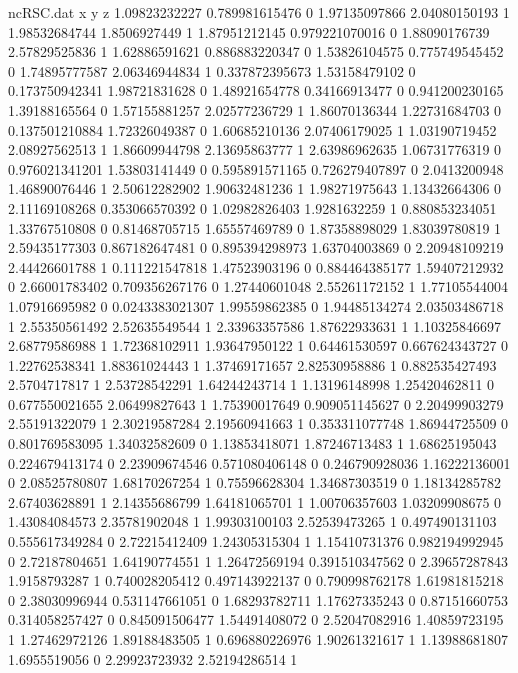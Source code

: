 \begin{filecontents}{ncRSC.dat}
x y z
1.09823232227 0.789981615476 0
1.97135097866 2.04080150193 1
1.98532684744 1.8506927449 1
1.87951212145 0.979221070016 0
1.88090176739 2.57829525836 1
1.62886591621 0.886883220347 0
1.53826104575 0.775749545452 0
1.74895777587 2.06346944834 1
0.337872395673 1.53158479102 0
0.173750942341 1.98721831628 0
1.48921654778 0.34166913477 0
0.941200230165 1.39188165564 0
1.57155881257 2.02577236729 1
1.86070136344 1.22731684703 0
0.137501210884 1.72326049387 0
1.60685210136 2.07406179025 1
1.03190719452 2.08927562513 1
1.86609944798 2.13695863777 1
2.63986962635 1.06731776319 0
0.976021341201 1.53803141449 0
0.595891571165 0.726279407897 0
2.0413200948 1.46890076446 1
2.50612282902 1.90632481236 1
1.98271975643 1.13432664306 0
2.11169108268 0.353066570392 0
1.02982826403 1.9281632259 1
0.880853234051 1.33767510808 0
0.81468705715 1.65557469789 0
1.87358898029 1.83039780819 1
2.59435177303 0.867182647481 0
0.895394298973 1.63704003869 0
2.20948109219 2.44426601788 1
0.111221547818 1.47523903196 0
0.884464385177 1.59407212932 0
2.66001783402 0.709356267176 0
1.27440601048 2.55261172152 1
1.77105544004 1.07916695982 0
0.0243383021307 1.99559862385 0
1.94485134274 2.03503486718 1
2.55350561492 2.52635549544 1
2.33963357586 1.87622933631 1
1.10325846697 2.68779586988 1
1.72368102911 1.93647950122 1
0.64461530597 0.667624343727 0
1.22762538341 1.88361024443 1
1.37469171657 2.82530958886 1
0.882535427493 2.5704717817 1
2.53728542291 1.64244243714 1
1.13196148998 1.25420462811 0
0.677550021655 2.06499827643 1
1.75390017649 0.909051145627 0
2.20499903279 2.55191322079 1
2.30219587284 2.19560941663 1
0.353311077748 1.86944725509 0
0.801769583095 1.34032582609 0
1.13853418071 1.87246713483 1
1.68625195043 0.224679413174 0
2.23909674546 0.571080406148 0
0.246790928036 1.16222136001 0
2.08525780807 1.68170267254 1
0.75596628304 1.34687303519 0
1.18134285782 2.67403628891 1
2.14355686799 1.64181065701 1
1.00706357603 1.03209908675 0
1.43084084573 2.35781902048 1
1.99303100103 2.52539473265 1
0.497490131103 0.555617349284 0
2.72215412409 1.24305315304 1
1.15410731376 0.982194992945 0
2.72187804651 1.64190774551 1
1.26472569194 0.391510347562 0
2.39657287843 1.9158793287 1
0.740028205412 0.497143922137 0
0.790998762178 1.61981815218 0
2.38030996944 0.531147661051 0
1.68293782711 1.17627335243 0
0.87151660753 0.314058257427 0
0.845091506477 1.54491408072 0
2.52047082916 1.40859723195 1
1.27462972126 1.89188483505 1
0.696880226976 1.90261321617 1
1.13988681807 1.6955519056 0
2.29923723932 2.52194286514 1

\end{filecontents}

